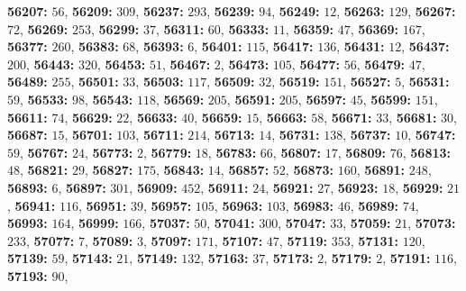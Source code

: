 \textsf{\bfseries 56207:} $56$, \textsf{\bfseries 56209:} $309$, \textsf{\bfseries 56237:} $293$, \textsf{\bfseries 56239:} $94$, \textsf{\bfseries 56249:} $12$, \textsf{\bfseries 56263:} $129$, \textsf{\bfseries 56267:} $72$, \textsf{\bfseries 56269:} $253$, \textsf{\bfseries 56299:} $37$, \textsf{\bfseries 56311:} $60$, \textsf{\bfseries 56333:} $11$, \textsf{\bfseries 56359:} $47$, \textsf{\bfseries 56369:} $167$, \textsf{\bfseries 56377:} $260$, \textsf{\bfseries 56383:} $68$, \textsf{\bfseries 56393:} $6$, \textsf{\bfseries 56401:} $115$, \textsf{\bfseries 56417:} $136$, \textsf{\bfseries 56431:} $12$, \textsf{\bfseries 56437:} $200$, \textsf{\bfseries 56443:} $320$, \textsf{\bfseries 56453:} $51$, \textsf{\bfseries 56467:} $2$, \textsf{\bfseries 56473:} $105$, \textsf{\bfseries 56477:} $56$, \textsf{\bfseries 56479:} $47$, \textsf{\bfseries 56489:} $255$, \textsf{\bfseries 56501:} $33$, \textsf{\bfseries 56503:} $117$, \textsf{\bfseries 56509:} $32$, \textsf{\bfseries 56519:} $151$, \textsf{\bfseries 56527:} $5$, \textsf{\bfseries 56531:} $59$, \textsf{\bfseries 56533:} $98$, \textsf{\bfseries 56543:} $118$, \textsf{\bfseries 56569:} $205$, \textsf{\bfseries 56591:} $205$, \textsf{\bfseries 56597:} $45$, \textsf{\bfseries 56599:} $151$, \textsf{\bfseries 56611:} $74$, \textsf{\bfseries 56629:} $22$, \textsf{\bfseries 56633:} $40$, \textsf{\bfseries 56659:} $15$, \textsf{\bfseries 56663:} $58$, \textsf{\bfseries 56671:} $33$, \textsf{\bfseries 56681:} $30$, \textsf{\bfseries 56687:} $15$, \textsf{\bfseries 56701:} $103$, \textsf{\bfseries 56711:} $214$, \textsf{\bfseries 56713:} $14$, \textsf{\bfseries 56731:} $138$, \textsf{\bfseries 56737:} $10$, \textsf{\bfseries 56747:} $59$, \textsf{\bfseries 56767:} $24$, \textsf{\bfseries 56773:} $2$, \textsf{\bfseries 56779:} $18$, \textsf{\bfseries 56783:} $66$, \textsf{\bfseries 56807:} $17$, \textsf{\bfseries 56809:} $76$, \textsf{\bfseries 56813:} $48$, \textsf{\bfseries 56821:} $29$, \textsf{\bfseries 56827:} $175$, \textsf{\bfseries 56843:} $14$, \textsf{\bfseries 56857:} $52$, \textsf{\bfseries 56873:} $160$, \textsf{\bfseries 56891:} $248$, \textsf{\bfseries 56893:} $6$, \textsf{\bfseries 56897:} $301$, \textsf{\bfseries 56909:} $452$, \textsf{\bfseries 56911:} $24$, \textsf{\bfseries 56921:} $27$, \textsf{\bfseries 56923:} $18$, \textsf{\bfseries 56929:} $21$, \textsf{\bfseries 56941:} $116$, \textsf{\bfseries 56951:} $39$, \textsf{\bfseries 56957:} $105$, \textsf{\bfseries 56963:} $103$, \textsf{\bfseries 56983:} $46$, \textsf{\bfseries 56989:} $74$, \textsf{\bfseries 56993:} $164$, \textsf{\bfseries 56999:} $166$, \textsf{\bfseries 57037:} $50$, \textsf{\bfseries 57041:} $300$, \textsf{\bfseries 57047:} $33$, \textsf{\bfseries 57059:} $21$, \textsf{\bfseries 57073:} $233$, \textsf{\bfseries 57077:} $7$, \textsf{\bfseries 57089:} $3$, \textsf{\bfseries 57097:} $171$, \textsf{\bfseries 57107:} $47$, \textsf{\bfseries 57119:} $353$, \textsf{\bfseries 57131:} $120$, \textsf{\bfseries 57139:} $59$, \textsf{\bfseries 57143:} $21$, \textsf{\bfseries 57149:} $132$, \textsf{\bfseries 57163:} $37$, \textsf{\bfseries 57173:} $2$, \textsf{\bfseries 57179:} $2$, \textsf{\bfseries 57191:} $116$, \textsf{\bfseries 57193:} $90$, 
